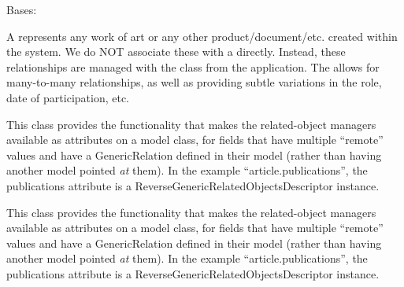 \documentclass[letterpaper,10pt,english]{sphinxmanual}
\begin{document}

\begin{fulllineitems}
\label{generated/apps.profiles.models:apps.profiles.models.Work}
Bases: {\hyperref[generated/apps.profiles.models:apps.profiles.models.BaseModel]{}}

A  represents any work of art or any other product/document/etc.
created within the system.  We do NOT associate these with a 
directly.  Instead, these relationships are managed with the 
 class from the  application.  The allows for
many-to-many relationships, as well as providing subtle variations in the
role, date of participation, etc.


\begin{fulllineitems}
\label{generated/apps.profiles.models:apps.profiles.models.Work.affiliations}
This class provides the functionality that makes the related-object
managers available as attributes on a model class, for fields that have
multiple ``remote'' values and have a GenericRelation defined in their model
(rather than having another model pointed \emph{at} them). In the example
``article.publications'', the publications attribute is a
ReverseGenericRelatedObjectsDescriptor instance.

\end{fulllineitems}



\begin{fulllineitems}
\label{generated/apps.profiles.models:apps.profiles.models.Work.unit_permissions}
This class provides the functionality that makes the related-object
managers available as attributes on a model class, for fields that have
multiple ``remote'' values and have a GenericRelation defined in their model
(rather than having another model pointed \emph{at} them). In the example
``article.publications'', the publications attribute is a
ReverseGenericRelatedObjectsDescriptor instance.

\end{fulllineitems}


\end{fulllineitems}
\end{document}
